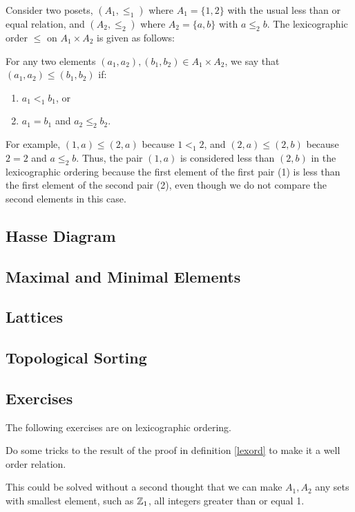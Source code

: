 \begin{example}
	Consider two posets, \( (A_1, \leq_1) \) where \( A_1 = \{1, 2\} \) with the usual less than or equal relation, and \( (A_2, \leq_2) \) where \( A_2 = \{a, b\} \) with \( a \leq_2 b \). The lexicographic order \( \leq \) on \( A_1 \times A_2 \) is given as follows:
	
	For any two elements \( (a_1, a_2), (b_1, b_2) \in A_1 \times A_2 \), we say that \( (a_1, a_2) \leq (b_1, b_2) \) if:
	
	\begin{enumerate}
		\item \( a_1 <_1 b_1 \), or
		\item \( a_1 = b_1 \) and \( a_2 \leq_2 b_2 \).
	\end{enumerate}
	
	For example, \( (1, a) \leq (2, a) \) because \( 1 <_1 2 \), and \( (2, a) \leq (2, b) \) because \( 2 = 2 \) and \( a \leq_2 b \). Thus, the pair \( (1, a) \) is considered less than \( (2, b) \) in the lexicographic ordering because the first element of the first pair (1) is less than the first element of the second pair (2), even though we do not compare the second elements in this case.
\end{example}

\subsection{Hasse Diagram}


\subsection{Maximal and Minimal Elements}


\subsection{Lattices}

\subsection{Topological Sorting}




\subsection{Exercises}


The following exercises are on lexicographic ordering.
\begin{exercise}
	Do some tricks to the result of the proof in definition \ref{lexord} to make it a well order relation.
\end{exercise}
\begin{solution}
	This could be solved without a second thought that we can make $A_1,A_2$ any sets with smallest element, such as $\mathbb{Z}_{1}$, all integers greater than or equal 1.
\end{solution}

